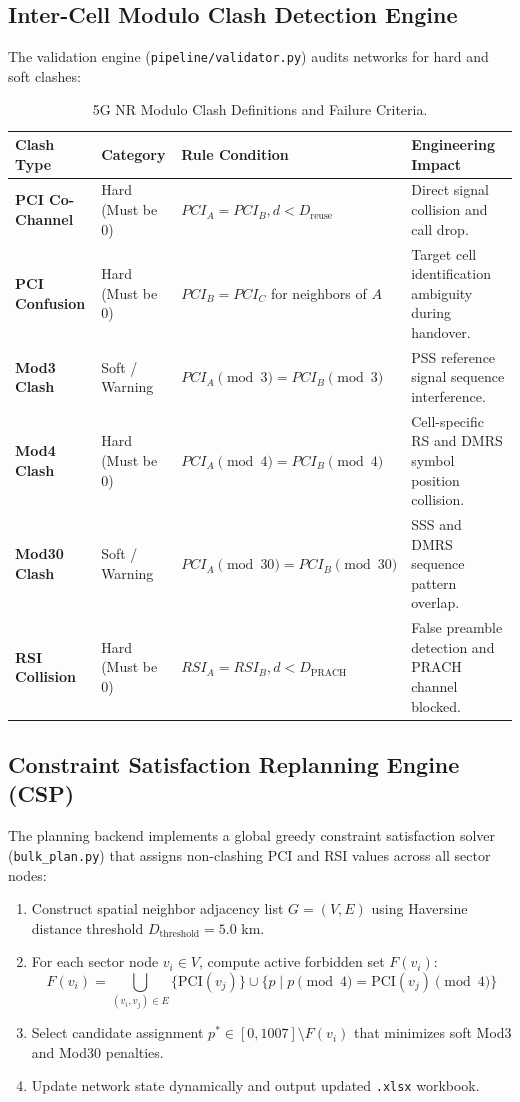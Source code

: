 \documentclass[12pt,a4paper]{report}
\begin{document}
\subsection{Inter-Cell Modulo Clash Detection Engine}
The validation engine (\texttt{pipeline/validator.py}) audits networks for hard and soft clashes:
\begin{table}[htbp]
\centering
\caption{5G NR Modulo Clash Definitions and Failure Criteria.}
\label{tab:mod_clashes}
\small
\begin{tabular}{lllp{6cm}}
\toprule
\textbf{Clash Type} & \textbf{Category} & \textbf{Rule Condition} & \textbf{Engineering Impact} \\
\midrule
\textbf{PCI Co-Channel} & Hard (Must be 0) & $PCI_A = PCI_B, d < D_{\text{reuse}}$ & Direct signal collision and call drop. \\
\textbf{PCI Confusion} & Hard (Must be 0) & $PCI_B = PCI_C$ for neighbors of $A$ & Target cell identification ambiguity during handover. \\
\textbf{Mod3 Clash} & Soft / Warning & $PCI_A \pmod 3 = PCI_B \pmod 3$ & PSS reference signal sequence interference. \\
\textbf{Mod4 Clash} & Hard (Must be 0) & $PCI_A \pmod 4 = PCI_B \pmod 4$ & Cell-specific RS and DMRS symbol position collision. \\
\textbf{Mod30 Clash} & Soft / Warning & $PCI_A \pmod {30} = PCI_B \pmod {30}$ & SSS and DMRS sequence pattern overlap. \\
\textbf{RSI Collision} & Hard (Must be 0) & $RSI_A = RSI_B, d < D_{\text{PRACH}}$ & False preamble detection and PRACH channel blocked. \\
\bottomrule
\end{tabular}
\end{table}

\subsection{Constraint Satisfaction Replanning Engine (CSP)}
The planning backend implements a global greedy constraint satisfaction solver (\texttt{bulk\_plan.py}) that assigns non-clashing PCI and RSI values across all sector nodes:
\begin{enumerate}
    \item Construct spatial neighbor adjacency list $G = (V, E)$ using Haversine distance threshold $D_{\text{threshold}} = 5.0$ km.
    \item For each sector node $v_i \in V$, compute active forbidden set $F(v_i)$:
    \begin{equation}
    F(v_i) = \bigcup_{(v_i, v_j) \in E} \{ \text{PCI}(v_j) \} \cup \{ p \mid p \pmod 4 = \text{PCI}(v_j) \pmod 4 \}
    \end{equation}
    \item Select candidate assignment $p^* \in [0, 1007] \setminus F(v_i)$ that minimizes soft Mod3 and Mod30 penalties.
    \item Update network state dynamically and output updated \texttt{.xlsx} workbook.
\end{enumerate}
\end{document}
